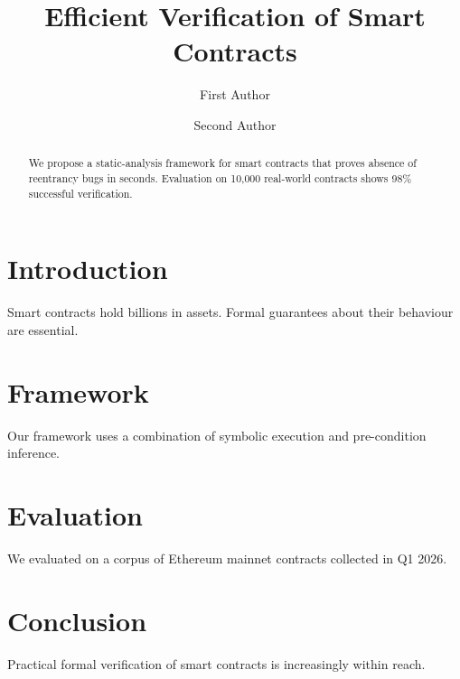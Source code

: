 \documentclass{llncs}
\begin{document}
\title{Efficient Verification of Smart Contracts}


\author{First Author \and Second Author}



\maketitle

\begin{abstract}
We propose a static-analysis framework for smart contracts that proves absence of reentrancy bugs in seconds. Evaluation on 10{,}000 real-world contracts shows 98\% successful verification.
\end{abstract}


\section{Introduction}
Smart contracts hold billions in assets. Formal guarantees about their behaviour are essential.

\section{Framework}
Our framework uses a combination of symbolic execution and pre-condition inference.

\section{Evaluation}
We evaluated on a corpus of Ethereum mainnet contracts collected in Q1 2026.

\section{Conclusion}
Practical formal verification of smart contracts is increasingly within reach.
\end{document}
